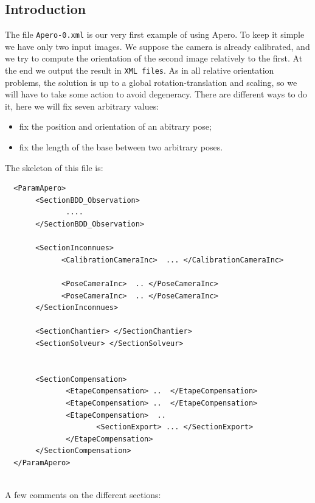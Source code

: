 \subsection{Introduction}

The file {\tt Apero-0.xml} is our very first example of using Apero.
To keep it simple we have only two input images. We suppose the camera
is already calibrated, and we try to compute the orientation
of the second image relatively to the first. At the end we output the result
in {\tt XML files}. As in all relative orientation problems, the solution
is  up to a global rotation-translation and scaling, so we will have to
take some action to avoid degeneracy. There are different ways to do it, here we will
fix seven arbitrary values:

\begin{itemize}
  \item  fix the position and orientation of an abitrary pose;
  \item  fix the length of the base between two arbitrary poses.
\end{itemize}





The skeleton of this file is:

{\scriptsize
\begin{verbatim}
  <ParamApero>
       <SectionBDD_Observation>
              ....
       </SectionBDD_Observation>

       <SectionInconnues>
             <CalibrationCameraInc>  ... </CalibrationCameraInc>

             <PoseCameraInc>  .. </PoseCameraInc>
             <PoseCameraInc>  .. </PoseCameraInc>
       </SectionInconnues>

       <SectionChantier> </SectionChantier>
       <SectionSolveur> </SectionSolveur>


       <SectionCompensation>
              <EtapeCompensation> ..  </EtapeCompensation>
              <EtapeCompensation> ..  </EtapeCompensation>
              <EtapeCompensation>  ..
                     <SectionExport> ... </SectionExport>
              </EtapeCompensation>
       </SectionCompensation>
  </ParamApero>


\end{verbatim}
}

A few comments on the different sections:


